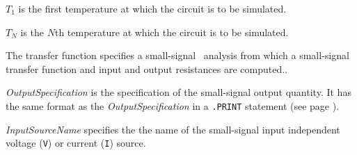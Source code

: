 \begin{widelist}
\item[{$T_1$}] is the first temperature at which the circuit is to be
simulated.
\item[{$T_N$}] is the $N$th temperature at which the circuit is to be
simulated.
\end{widelist}


%
%
{

} %

%
%

The transfer function specifies a small-signal \dc\ analysis from which
a small-signal transfer function and input and output resistances are computed..


\begin{widelist}

\item[{\it OutputSpecification}]  is the specification of the small-signal output
     quantity.  It has the same format as the
     {\it OutputSpecification} in a {\tt .PRINT} statement (see page
     \pageref{.PRINTstatement}).

\item[{\it InputSourceName}]  specifies the the name of the small-signal input
     independent voltage ({\tt V}) or current ({\tt I}) source.
\end{widelist}


